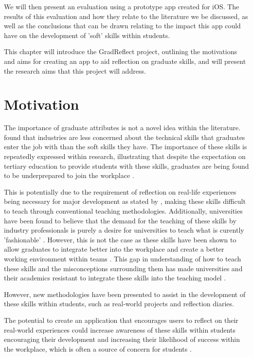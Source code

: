 \documentclass{l4proj}
\begin{document}
We will then present an evaluation using a prototype app created for iOS. The results of this evaluation and how they relate to the literature we be discussed, as well as the conclusions that can be drawn relating to the impact this app could have on the development of 'soft' skills within students.

This chapter will introduce the GradReflect project, outlining the motivations and aims for creating an app to aid reflection on graduate skills, and will present the research aims that this project will address.

\section{Motivation}
The importance of graduate attributes is not a novel idea within the literature. \citet{litchfield_contextualising_2010} found that industries are less concerned about the technical skills that graduates enter the job with than the soft skills they have. The importance of these skills is repeatedly expressed within research, illustrating that despite the expectation on tertiary education to provide students with these skills, graduates are being found to be underprepared to join the workplace \citep{stevens_industry_2016}. 
 
This is potentially due to the requirement of reflection on real-life experiences being necessary for major development as stated by \citet{abernethy_teaching_2009}, making these skills difficult to teach through conventional teaching methodologies. Additionally, universities have been found to believe that the demand for the teaching of these skills by industry professionals is purely a desire for universities to teach what is curently 'fashionable' \citep{stevens_industry_2016}. However, this is not the case as these skills have been shown to allow graduates to integrate better into the workplace and create a better working environment within teams \citep{stevens_industry_2016}. This gap in understanding of how to teach these skills and the misconceptions surrounding them has made universities and their academics resistant to integrate these skills into the teaching model \citep{barr_2019}. 

However, new methodologies have been presented to assist in the development of these skills within students, such as real-world projects and reflection diaries.

The potential to create an application that encourages users to reflect on their real-world experiences could increase awareness of these skills within students encouraging their development and increasing their likelihood of success within the workplace, which is often a source of concern for students \citep{stevens_industry_2016}.
\end{document}
